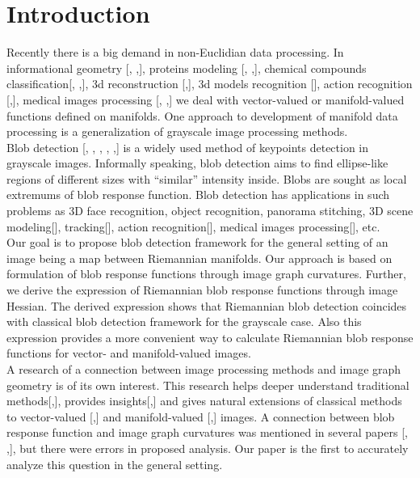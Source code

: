 \documentclass{llncs}
\begin{document}
\section{Introduction}
%
Recently there is a big demand in non-Euclidian data processing. In informational geometry [, ,], proteins modeling [, ,], chemical compounds classification[, ,], 3d reconstruction [,], 3d models recognition [], action recognition [,], medical images processing [, ,] we deal with vector-valued or manifold-valued functions defined on manifolds. One approach to development of manifold data processing is a generalization of grayscale image processing methods. 
\\
Blob detection [, , , , ,] is a widely used method of keypoints detection in grayscale images. Informally speaking, blob detection aims to find ellipse-like regions of different sizes with “similar” intensity inside. Blobs are sought as local extremums of blob response function. Blob detection has applications in such problems as 3D face recognition, object recognition, panorama stitching, 3D scene modeling[], tracking[], action recognition[], medical images processing[], etc.
\\
Our goal is to propose blob detection framework for the general setting of an image being a map between Riemannian manifolds. Our approach is based on formulation of blob response functions through image graph curvatures. Further, we derive the expression of Riemannian blob response functions through image Hessian. The derived expression shows that Riemannian blob detection coincides with classical blob detection framework for the grayscale case. Also this expression provides a more convenient way to calculate Riemannian blob response functions for vector- and manifold-valued images.
\\
A research of a connection between image processing methods and image graph geometry is of its own interest. This research helps deeper understand traditional methods[,], provides insights[,] and gives natural extensions of classical methods to vector-valued [,] and manifold-valued [,] images. A connection between blob response function and image graph curvatures was mentioned in several papers [, ,], but there were errors in proposed analysis. Our paper is the first to accurately analyze this question in the general setting.
\end{document}
